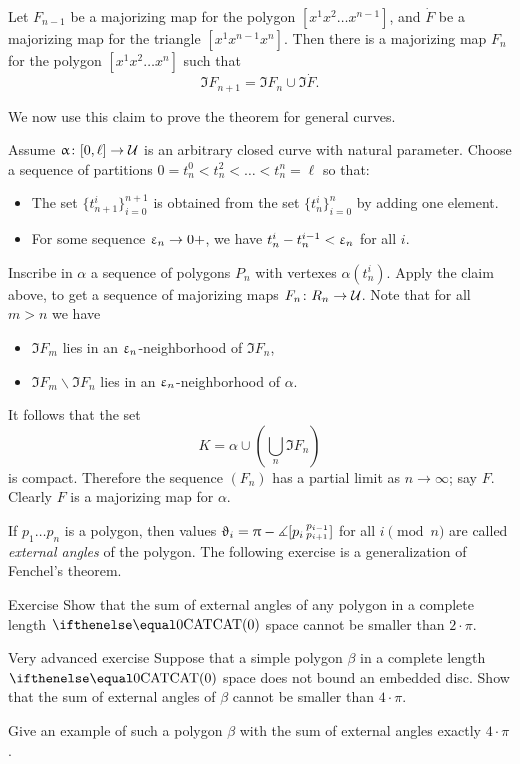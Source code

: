 \begin{clm}{}
Let $F_{n-1}$ be a majorizing map for the polygon $[x^1x^2\dots x^{n-1}]$,
and $\dot F$ be a majorizing map for the triangle $[x^1x^{n-1}x^{n}]$.
Then there is a majorizing map $F_n$ for the polygon $[x^1x^2\dots x^n]$
such that \[\Im F_{n+1}= \Im F_n\cup\Im \dot F.\]

\end{clm}

We now use this claim to prove the theorem for general curves.

Assume $\alpha\:[0,\ell]\to\spc{U}$ is an  arbitrary closed curve with natural parameter.
Choose a sequence of partitions $0=t^0_n<t^2_n<\dots<t^n_n=\ell$
so that:
\begin{itemize}
\item The set $\{t_{n+1}^i\}_{i=0}^{n+1}$ 
is obtained from the set  $\{t_n^i\}_{i=0}^n$ by adding one element.
\item For some sequence $\eps_n\to0+$,
we have $t^i_n-t^{i-1}_n<\upvarepsilon_n$ for all $i$.
\end{itemize}

Inscribe in $\alpha$ a sequence of polygons $P_n$ with vertexes $\alpha(t^i_n)$.
Apply the claim above, to get a sequence of majorizing maps $F_n\:R_n\to\spc{U}$.
Note that for all $m>n$ we have
\begin{itemize}
\item $\Im F_m$ lies in an  $\upvarepsilon_n$-neighborhood of $\Im F_n$,
\item $\Im F_m\backslash \Im F_n$ lies in an  $\upvarepsilon_n$-neighborhood of $\alpha$.
\end{itemize}
It follows that the set
\[K=\alpha\cup\left(\bigcup_n\Im F_n\right)\]
is compact.
Therefore the sequence $(F_n)$
has a partial limit as $n\to\infty$; 
say $F$.
Clearly $F$ is a majorizing map for $\alpha$.
\qeds

If $p_1\dots p_n$ is a polygon, then values $\upvartheta_i=\uppi-\measuredangle[p_i\,{}^{p_{i-1}}_{p_{i+1}}]$ for all $i\pmod n$ are called \emph{external angles} of the polygon.
The following exercise is a generalization of Fenchel's theorem.

\begin{thm}{Exercise}\label{ex:fenchel}
Show that the sum of external angles of any polygon in a complete length $\CAT0$ space cannot be smaller than $2\cdot\pi$. 
\end{thm}

\begin{thm}{Very advanced exercise}\label{ex:FM}
Suppose that a simple polygon $\beta$ in a complete length $\CAT0$ space does not bound an embedded disc.
Show that the sum of external angles of $\beta$ cannot be smaller than $4\cdot\pi$.

Give an example of such a polygon $\beta$ with the sum of external angles exactly $4\cdot\pi$.
\end{thm}

